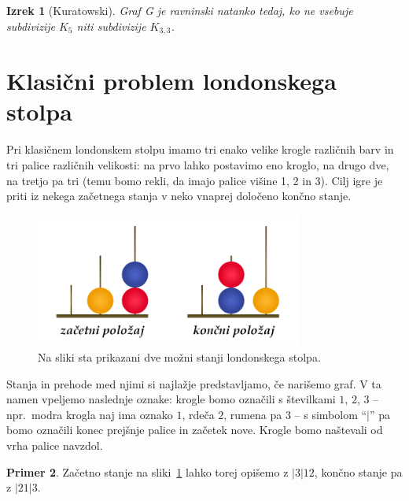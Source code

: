 \documentclass[12pt,a4paper]{amsart}
\theoremstyle{definition} %
\newtheorem{definicija}{Definicija}[section]
\newtheorem{primer}[definicija]{Primer}
\theoremstyle{plain} %
\newtheorem{izrek}[definicija]{Izrek}
\newcommand{\N}{\mathbb N}
\newcommand{\graf}[1][G]{\ensuremath{#1 = (V(#1), E(#1))}}
\newcommand{\vozlisca}[1][G]{\ensuremath{V(#1)}}
\newcommand{\povezave}[1][G]{\ensuremath{E(#1)}}
\begin{document}
\begin{izrek}[Kuratowski]
    \label{izr:kuratowski}
    Graf G je ravninski natanko tedaj, ko ne vsebuje subdivizije $K_5$ niti subdivizije $K_{3,3}$.
\end{izrek}

\section{Klasični problem londonskega stolpa}
Pri klasičnem londonskem stolpu imamo tri enako velike krogle različnih barv in tri palice različnih velikosti: na prvo lahko postavimo eno kroglo, na drugo dve, na tretjo pa tri (temu bomo rekli, da imajo palice višine 1, 2 in 3). Cilj igre je priti iz nekega začetnega stanja v neko vnaprej določeno končno stanje.

\begin{figure}[h]
    \includegraphics[width=250pt]{img/london-tower.png}
    \caption{Na sliki sta prikazani dve možni stanji londonskega stolpa.}
    \label{fig:stanji}
\end{figure}

Stanja in prehode med njimi si najlažje predstavljamo, če narišemo graf. V ta namen vpeljemo naslednje oznake:
krogle bomo označili s številkami $1$, $2$, $3$ -- npr.\ modra krogla naj ima oznako $1$, rdeča $2$, rumena pa $3$ -- s simbolom ``$|$'' pa bomo označili konec prejšnje palice in začetek nove. Krogle bomo naštevali od vrha palice navzdol.

\begin{primer}
    Začetno stanje na sliki~\ref{fig:stanji} lahko torej opišemo z $|3|12$, končno stanje pa z $|21|3$.
\end{primer}
\medskip
\end{document}
